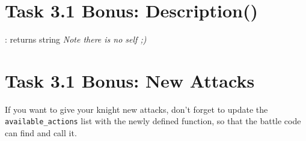 \pagebreak

\section{Task 3.1 Bonus: Description()}
: returns string \small{\textit{Note there is no self ;)}}

\pagebreak

\section{Task 3.1 Bonus: New Attacks}
If you want to give your knight new attacks, don't forget to update the 
\texttt{available\_actions} list with the newly defined function, so that the
battle code can find and call it.\\


